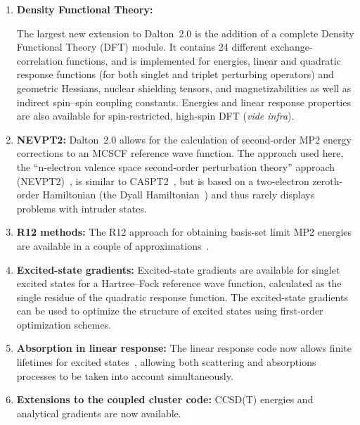 \begin{enumerate}
\item{\bf Density Functional Theory:}

The largest new extension to Dalton~2.0 is the addition of a complete
Density Functional Theory (DFT) module. It contains 24 different
exchange-correlation  functions,
 and is implemented for energies,
linear and quadratic response functions (for both singlet and triplet
perturbing operators) and geometric Hessians, nuclear shielding
tensors, and magnetizabilities as well as indirect spin--spin coupling
constants. Energies and linear response properties are also available
for spin-restricted, high-spin DFT ({\em vide infra\/}).


\item{\bf NEVPT2:} Dalton~2.0 allows for the calculation of
  second-order MP2 energy corrections to an MCSCF reference wave
  function. The approach used here, the ``n-electron valence space
  second-order perturbation theory'' approach (NEVPT2)~\cite{carcsetljpmjcp114,carcjpmcpl350,carcjpmjcp117}, is similar to
  CASPT2~\cite{kapamborjcp96}, but is based on a two-electron zeroth-order
  Hamiltonian (the Dyall Hamiltonian~\cite{kgdjcp102}) and thus rarely displays
  problems with intruder states.

\item{\bf R12 methods:} The R12 approach for obtaining basis-set limit
MP2 energies are available in a couple of  approximations~\cite{wkccmsjcp116,ccmswkthcpc149}.

\item{\bf Excited-state gradients:} Excited-state gradients are
  available for singlet excited states for a Hartree--Fock reference
  wave function, calculated as the single residue of the quadratic
  response function. The excited-state gradients can be used to
  optimize the structure of excited states using first-order
  optimization schemes.

\item{\bf Absorption in linear response:} The linear response code now
  allows finite lifetimes for excited states~\cite{pndmbhjajjojcp115}, allowing both scattering
  and absorptions processes to be taken into account simultaneously.

\item{\bf Extensions to the coupled cluster code:} CCSD(T) energies
  and analytical gradients are now available.


\end{enumerate}
